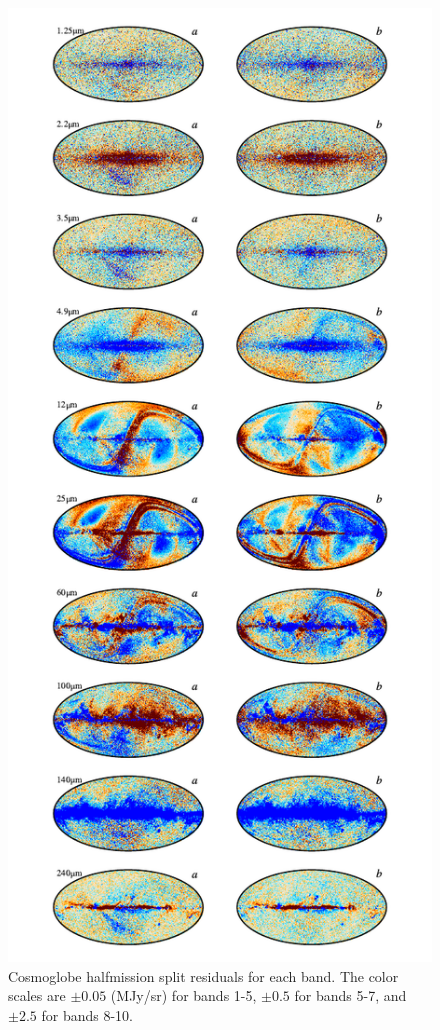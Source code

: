 \documentclass{aa}
\begin{document}
\begin{figure}
	\centering
	\includegraphics[width=\textwidth,height=\textheight - 20pt,keepaspectratio]{figs/res_halfmission_c0001_000019.pdf}
	\caption{Cosmoglobe halfmission split residuals for each band. The color scales are $\pm 0.05$ (MJy/sr) for bands 1-5, $\pm 0.5$ for bands 5-7, and $\pm 2.5$ for bands 8-10.}
	\label{fig:res}
\end{figure}
\end{document}
